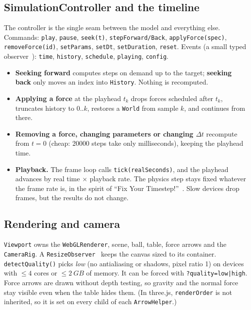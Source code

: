 \documentclass[11pt]{article}
\begin{document}
\subsection{SimulationController and the timeline}
{\sloppy The controller is the single seam between the model and everything else. Commands:
\texttt{play}, \texttt{pause}, \texttt{seek(t)}, \texttt{stepForward/Back}, \texttt{applyForce(spec)},
\texttt{removeForce(id)}, \texttt{setParams}, \texttt{setDt}, \texttt{setDuration}, \texttt{reset}.
Events (a small typed observer~\cite{gamma1994}): \texttt{time}, \texttt{history}, \texttt{schedule},
\texttt{playing}, \texttt{config}.\par}
\begin{itemize}
  \item \textbf{Seeking forward} computes steps on demand up to the target; \textbf{seeking back}
        only moves an index into \texttt{History}. Nothing is recomputed.
  \item \textbf{Applying a force} at the playhead $t_k$ drops forces scheduled after $t_k$, truncates
        history to $0..k$, restores a \texttt{World} from sample $k$, and continues from there.
  \item \textbf{Removing a force, changing parameters or changing $\Delta t$} recompute from $t=0$
        (cheap: \num{20000} steps take only milliseconds), keeping the playhead time.
  \item \textbf{Playback.} The frame loop calls \texttt{tick(realSeconds)}, and the playhead advances by
        real time $\times$ playback rate. The physics step stays fixed whatever the frame rate is,
        in the spirit of ``Fix Your Timestep!''~\cite{fiedler2004}. Slow devices drop frames, but the
        results do not change.
\end{itemize}

\subsection{Rendering and camera}
\texttt{Viewport} owns the \texttt{WebGLRenderer}, scene, ball, table, force arrows and the
\texttt{CameraRig}. A \texttt{ResizeObserver}~\cite{mdnresize} keeps the canvas sized to its container.
\texttt{detectQuality()} picks \emph{low} (no antialiasing or shadows, pixel ratio 1) on devices
with $\le 4$ cores or $\le\SI{2}{GB}$ of memory. It can be forced with \texttt{?quality=low|high}.
Force arrows are drawn without depth testing, so gravity and the normal force stay visible
even when the table hides them. (In three.js, \texttt{renderOrder} is not inherited, so it is
set on every child of each \texttt{ArrowHelper}.)
\end{document}

